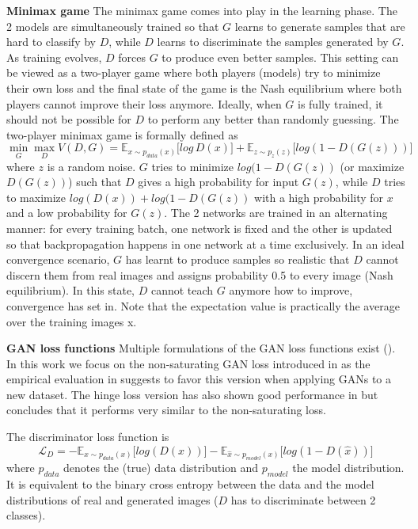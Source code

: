 \documentclass[12pt,a4paper]{article}
\begin{document}
\par \textbf{Minimax game} The minimax game comes into play in the learning phase. The 2 models are simultaneously trained so that $G$ learns to generate samples that are hard to classify by $D$, while $D$ learns to discriminate the samples generated by $G$. As training evolves, $D$ forces $G$ to produce even better samples. This setting can be viewed as a two-player game where both players (models) try to minimize their own loss and the final state of the game is the Nash equilibrium where both players cannot improve their loss anymore. Ideally, when $G$ is fully trained, it should not be possible for $D$ to perform any better than randomly guessing. The two-player minimax game is formally defined as
\begin{equation} \label{eq:1}
\min\limits_{G} \max\limits_{D} V(D,G) = \mathbb{E}_{x\sim p_{data} (x)}\big[log\, D(x)\big] + \mathbb{E}_{z\sim p_{z} (z)}\big[log(1 - D(G(z)))\big]
\end{equation}
where $z$ is a random noise. $G$ tries to minimize $log(1 - D(G(z))$ (or maximize $D(G(z))$) such that $D$ gives a high probability for input $G(z)$, while $D$ tries to maximize $log(D(x)) + log(1 - D(G(z))$ with a high probability for $x$ and a low probability for $G(z)$. The 2 networks are trained in an alternating manner: for every training batch, one network is fixed and the other is updated so that backpropagation happens in one network at a time exclusively. In an ideal convergence scenario, $G$ has learnt to produce samples so realistic that $D$ cannot discern them from real images and assigns probability 0.5 to every image (Nash equilibrium). In this state, $D$ cannot teach $G$ anymore how to improve, convergence has set in. Note that the expectation value is practically the average over the training images x.

\par \textbf{GAN loss functions} 
Multiple formulations of the GAN loss functions exist (\cite{GANLandscape}). In this work we focus on the non-saturating GAN loss introduced in \cite{1406.2661} as the empirical evaluation in \cite{GANLandscape} suggests to favor this version when applying GANs to a new dataset. The hinge loss version has also shown good performance in \cite{SNGAN} but \cite{GANLandscape} concludes that it performs very similar to the non-saturating loss.

The discriminator loss function is
\begin{equation} \label{eq:d_loss}
    \mathcal{L}_{D} = -\mathbb{E}_{x\sim p_{data} (x)}\big[log(D(x))\big] - \mathbb{E}_{\hat{x}\sim p_{model} (x)}\big[log(1 - D(\hat{x}))\big]
\end{equation}
where $p_{data}$ denotes the (true) data distribution and $p_{model}$ the model distribution. It is equivalent to the binary cross entropy between the data and the model distributions of real and generated images ($D$ has to discriminate between 2 classes).
\end{document}
